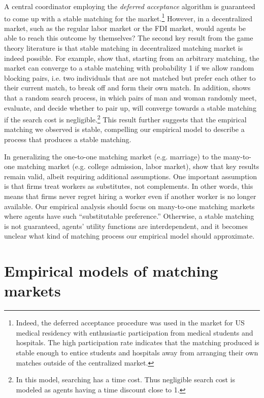 A central coordinator employing the \textit{deferred acceptance} algorithm is
guaranteed to come up with a stable matching for the market.\footnote{Indeed,
  the deferred acceptance procedure was used in the market for US medical
  residency with enthusiastic participation from medical students and hospitals.
  The high participation rate indicates that the matching produced is stable enough to entice students and
hospitals away from arranging their own matches outside of the centralized
market.} However, in a decentralized market, such as the regular labor market or
the FDI market,
would agents be able to reach this outcome by themselves? The second key result
from the game theory literature is that stable matching in decentralized
matching market is indeed possible. For example, \citet{Roth2016} show that, starting from
an arbitrary matching, the market can converge to a stable matching with
probability 1 if we allow random blocking pairs, i.e. two individuals that are
not matched but prefer each other to their current match, to
break off and form their own match. In addition, \citet{Adachi2003} shows that a random search process, in
which pairs of man and woman randomly meet, evaluate, and decide whether to pair up, will
converge towards a stable matching if the search cost is negligible.\footnote{In
this model, searching has a time cost. Thus negligible search cost is modeled as
agents having a time discount close to 1.} This result further suggests that the
empirical matching we observed is stable, compelling our empirical model to
describe a process that produces a stable matching.

In generalizing the one-to-one matching market (e.g. marriage) to the
many-to-one matching market (e.g. college admission, labor market),
\citet{Roth1992} show that key results remain valid, albeit requiring additional
assumptions. One important assumption is that firms treat workers as substitutes, not
complements. In other words, this means that firms never regret hiring a worker
even if
another worker is no longer available. Our empirical analysis should focus on
many-to-one matching markets where agents have such ``substitutable
preference.'' Otherwise, a stable matching is not guaranteed, agents' utility functions
are interdependent, and it becomes unclear what kind of matching process our
empirical model should approximate.

\section{Empirical models of matching markets}

